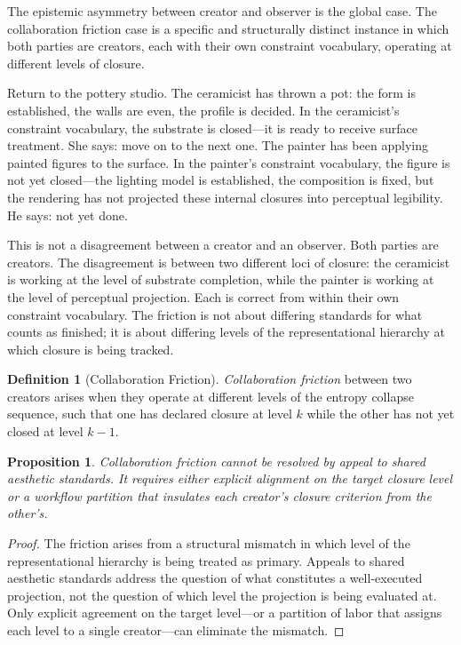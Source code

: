 \documentclass[12pt, twoside]{article}
\theoremstyle{plain}
\newtheorem{proposition}[theorem]{Proposition}
\theoremstyle{definition}
\newtheorem{definition}[theorem]{Definition}
\theoremstyle{remark}
\begin{document}
The epistemic asymmetry between creator and observer is the global case. The collaboration friction case is a specific and structurally distinct instance in which both parties are creators, each with their own constraint vocabulary, operating at different levels of closure.

Return to the pottery studio. The ceramicist has thrown a pot: the form is established, the walls are even, the profile is decided. In the ceramicist's constraint vocabulary, the substrate is closed---it is ready to receive surface treatment. She says: move on to the next one. The painter has been applying painted figures to the surface. In the painter's constraint vocabulary, the figure is not yet closed---the lighting model is established, the composition is fixed, but the rendering has not projected these internal closures into perceptual legibility. He says: not yet done.

This is not a disagreement between a creator and an observer. Both parties are creators. The disagreement is between two different loci of closure: the ceramicist is working at the level of substrate completion, while the painter is working at the level of perceptual projection. Each is correct from within their own constraint vocabulary. The friction is not about differing standards for what counts as finished; it is about differing levels of the representational hierarchy at which closure is being tracked.

\begin{definition}[Collaboration Friction]
\emph{Collaboration friction} between two creators arises when they operate at different levels of the entropy collapse sequence, such that one has declared closure at level $k$ while the other has not yet closed at level $k-1$.
\end{definition}

\begin{proposition}
\label{prop:friction}
Collaboration friction cannot be resolved by appeal to shared aesthetic standards. It requires either explicit alignment on the target closure level or a workflow partition that insulates each creator's closure criterion from the other's.
\end{proposition}

\begin{proof}
The friction arises from a structural mismatch in which level of the representational hierarchy is being treated as primary. Appeals to shared aesthetic standards address the question of what constitutes a well-executed projection, not the question of which level the projection is being evaluated at. Only explicit agreement on the target level---or a partition of labor that assigns each level to a single creator---can eliminate the mismatch.
\end{proof}
\end{document}
